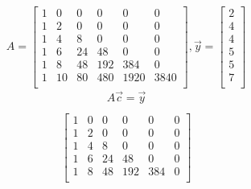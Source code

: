 \documentclass{article}
\begin{document}
            \paragraph{
                \begin{equation*}
                    A=
                    \begin{bmatrix}
                        1&0&0&0&0&0\\
                        1&2&0&0&0&0\\
                        1&4&8&0&0&0\\
                        1&6&24&48&0&0\\
                        1&8&48&192&384&0\\
                        1&10&80&480&1920&3840\\
                    \end{bmatrix}
                    ,
                    \vec{y}=
                    \begin{bmatrix}
                        2\\
                        4\\
                        4\\
                        5\\
                        5\\
                        7\\    
                    \end{bmatrix}
                \end{equation*}
                \begin{equation*}
                    \begin{split}
                        A\vec{c}=\vec{y}\\
                    \end{split}
                \end{equation*}
                \begin{equation*}
                    \begin{split}
                        \begin{bmatrix}
                            1&0&0&0&0&0\\
                            1&2&0&0&0&0\\
                            1&4&8&0&0&0\\
                            1&6&24&48&0&0\\
                            1&8&48&192&384&0\\

\end{bmatrix}
\end{split}
\end{equation*}}
\end{document}
